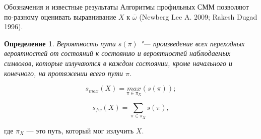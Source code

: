 \documentclass[ucs, notheorems, handout, 10pt]{beamer}
\newtheorem{defenition}{Определение}
\begin{document}
	\begin{frame}{Обозначения и известные результаты}				
		Алгоритмы профильных СММ позволяют по-разному оценивать выравнивание $X$ к $\overline{\omega}$ (Newberg Lee A. 2009; Rakesh Dugad 1996). 
		
		\begin{defenition}
			Вероятность пути $s(\pi)$ "--- произведение всех переходных вероятностей от состояний к состоянию и вероятностей наблюдаемых символов, которые излучаются в каждом состоянии, кроме начального и конечного, на протяжении всего пути $\pi$. 
		\end{defenition}		
		
		\begin{equation*}
			s_{max}(X) = \underset{\pi \in \pi_{X}}{max}(s(\pi)); \label{eq:1}
		\end{equation*}
		
		\begin{equation*}
			s_{fw}(X) = \sum_{\pi \in \pi_{X}}s(\pi), \label{eq:2}
		\end{equation*}
		
		где $\pi_{X}$ --- это путь, который мог излучить $X$.
		
	\end{frame}
	
\end{document}
